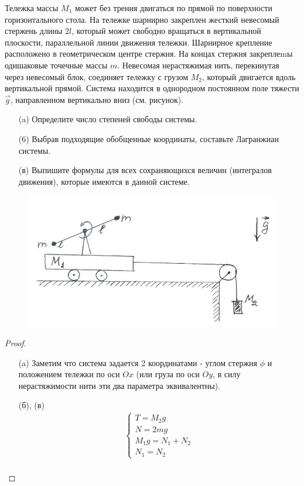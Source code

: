 \begin{prob}
Тележка массы $M_1$ может без трения двигаться по прямой по поверхности горизонтального стола. На тележке шарнирно закреплен жесткий невесомый стержень длины $2 l$, который может свободно вращаться в вертикальной плоскости, параллельной линии движения тележки. Шарнирное крепление расположено в геометрическом центре стержня. На концах стержня закреплеmы одишаковые точечные массы $m$. Невесомая нерастяжимая нить, перекинутая через невесомый блок, соединяет тележку с грузом $M_2$, который двигается вдоль вертикальной прямой. Система находится в однородном постоянном поле тяжести $\vec{g}$, направленном вертикально вниз (см. рисунок).
\begin{itemize}
\item[]
\item[(a)] Определите число степеней свободы системы.
\item[(6)] Выбрав подходящие обобщенные координаты, составьте Лагранжиан системы.
\item[(в)] Выпишите формулы для всех сохраняющихся величин (интегралов движения), которые имеются в данной системе.
\end{itemize}
\begin{figure}[h!]
\includegraphics[scale=0.55]{IMG/img_2}
\end{figure}
\end{prob}

\begin{proof}
\begin{itemize}
\item[]
\item[(a)] Заметим что система задается 2 координатами - углом стержня $\phi$ и положением тележки по оси $O x$ (или груза по оси $O y$, в силу нерастяжимости нити эти два параметра эквивалентны).
\item[(б), (в)] 
    \begin{gather*}
        \begin{cases}
            T = M_2 g\\
            N = 2 m g\\
            M_1 g = N_1 + N_2\\
            N_1 = N_2
        \end{cases}\\
    \end{gather*}
\end{itemize}
\end{proof}
\vskip 0.6in




